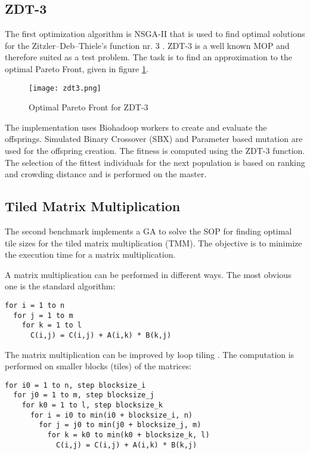 \subsection{ZDT-3}
\label{chap:evaluation:zdt3}
The first optimization algorithm is NSGA-II that is used to find optimal solutions for the Zitzler–Deb–Thiele's function nr. 3 \cite{zitzler2000comparison}. ZDT-3 is a well known MOP and therefore suited as a test problem. The task is to find an approximation to the optimal Pareto Front, given in figure \ref{fig:zdt3}.

\begin{figure}
  \centering
  \texttt{[image: zdt3.png]}
  \caption[Optimal Pareto Front for ZDT-3]{Optimal Pareto Front for ZDT-3}
  \label{fig:zdt3}
\end{figure}

The implementation uses Biohadoop workers to create and evaluate the offsprings. Simulated Binary Crossover (SBX) and Parameter based mutation \cite{deb2000efficient} are used for the offspring creation. The fitness is computed using the ZDT-3 function. The selection of the fittest individuals for the next population is based on ranking and crowding distance and is performed on the master.

\subsection{Tiled Matrix Multiplication}
\label{chap:evaluation:tiledmul}
The second benchmark implements a GA to solve the SOP for finding optimal tile sizes for the tiled matrix multiplication (TMM). The objective is to minimize the execution time for a matrix multiplication.

A matrix multiplication can be performed in different ways. The most obvious one is the standard algorithm:
\begin{lstlisting}
for i = 1 to n
  for j = 1 to m
    for k = 1 to l
      C(i,j) = C(i,j) + A(i,k) * B(k,j)
\end{lstlisting}

The matrix multiplication can be improved by loop tiling \cite{wolfe1989more}. The computation is performed on smaller blocks (tiles) of the matrices:
\begin{lstlisting}
for i0 = 1 to n, step blocksize_i
  for j0 = 1 to m, step blocksize_j
    for k0 = 1 to l, step blocksize_k
      for i = i0 to min(i0 + blocksize_i, n)
        for j = j0 to min(j0 + blocksize_j, m)
          for k = k0 to min(k0 + blocksize_k, l)
            C(i,j) = C(i,j) + A(i,k) * B(k,j)
\end{lstlisting}


